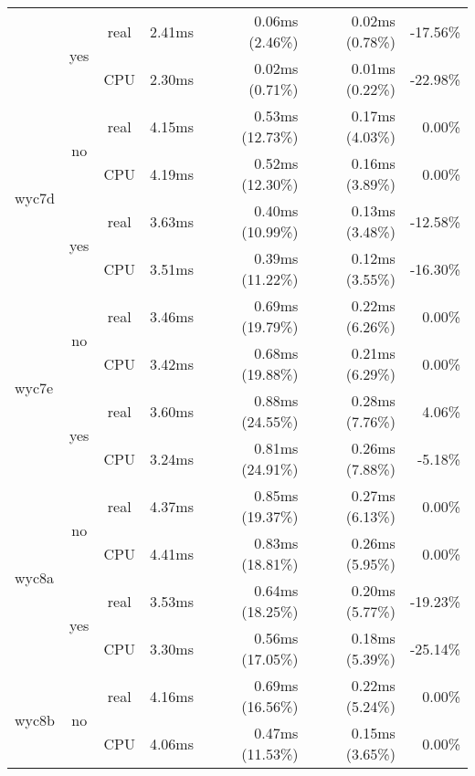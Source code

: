 \documentclass[en]{pracamgr}
\begin{document}
\begin{small}
\begin{longtable}{|l|c|c|r|r|r|r|}
                          \cline{2-7}
                          & \multirow{2}{*}{yes} & real & 2.41ms & 0.06ms (2.46\%) & 0.02ms (0.78\%) & -17.56\% \\*
                          &                      & CPU  & 2.30ms & 0.02ms (0.71\%) & 0.01ms (0.22\%) & -22.98\% \\
\hline
\multirow{4}{*}{wyc7d}    & \multirow{2}{*}{no}  & real & 4.15ms & 0.53ms (12.73\%) & 0.17ms (4.03\%) & 0.00\% \\*
                          &                      & CPU  & 4.19ms & 0.52ms (12.30\%) & 0.16ms (3.89\%) & 0.00\% \\*
                          \cline{2-7}
                          & \multirow{2}{*}{yes} & real & 3.63ms & 0.40ms (10.99\%) & 0.13ms (3.48\%) & -12.58\% \\*
                          &                      & CPU  & 3.51ms & 0.39ms (11.22\%) & 0.12ms (3.55\%) & -16.30\% \\
\hline
\multirow{4}{*}{wyc7e}    & \multirow{2}{*}{no}  & real & 3.46ms & 0.69ms (19.79\%) & 0.22ms (6.26\%) & 0.00\% \\*
                          &                      & CPU  & 3.42ms & 0.68ms (19.88\%) & 0.21ms (6.29\%) & 0.00\% \\*
                          \cline{2-7}
                          & \multirow{2}{*}{yes} & real & 3.60ms & 0.88ms (24.55\%) & 0.28ms (7.76\%) & 4.06\% \\*
                          &                      & CPU  & 3.24ms & 0.81ms (24.91\%) & 0.26ms (7.88\%) & -5.18\% \\
\hline
\multirow{4}{*}{wyc8a}    & \multirow{2}{*}{no}  & real & 4.37ms & 0.85ms (19.37\%) & 0.27ms (6.13\%) & 0.00\% \\*
                          &                      & CPU  & 4.41ms & 0.83ms (18.81\%) & 0.26ms (5.95\%) & 0.00\% \\*
                          \cline{2-7}
                          & \multirow{2}{*}{yes} & real & 3.53ms & 0.64ms (18.25\%) & 0.20ms (5.77\%) & -19.23\% \\*
                          &                      & CPU  & 3.30ms & 0.56ms (17.05\%) & 0.18ms (5.39\%) & -25.14\% \\
\hline
\multirow{4}{*}{wyc8b}    & \multirow{2}{*}{no}  & real & 4.16ms & 0.69ms (16.56\%) & 0.22ms (5.24\%) & 0.00\% \\*
                          &                      & CPU  & 4.06ms & 0.47ms (11.53\%) & 0.15ms (3.65\%) & 0.00\% \\*

\end{longtable}
\end{small}
\end{document}
